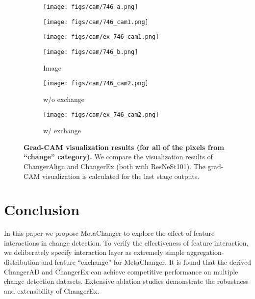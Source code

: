 \documentclass[10pt,twocolumn,letterpaper]{article}
\begin{document}
\begin{figure}
  \centering
  \begin{subfigure}{0.322\linewidth}
    \texttt{[image: figs/cam/746\_a.png]}
\label{fig:cam-a1}
  \end{subfigure}
  \hfill
  \begin{subfigure}{0.322\linewidth}
    \texttt{[image: figs/cam/746\_cam1.png]}
\label{fig:cam-a2}
  \end{subfigure}
  \hfill
  \begin{subfigure}{0.322\linewidth}
    \texttt{[image: figs/cam/ex\_746\_cam1.png]}
\label{fig:cam-a3}
  \end{subfigure}
  \hfill
  \begin{subfigure}{0.322\linewidth}
    \texttt{[image: figs/cam/746\_b.png]}
    \caption{ Image}
    \label{fig:cam-a4}
  \end{subfigure}
  \hfill
  \begin{subfigure}{0.322\linewidth}
    \texttt{[image: figs/cam/746\_cam2.png]}
    \caption{w/o exchange}
    \label{fig:cam-a5}
  \end{subfigure}
  \hfill
  \begin{subfigure}{0.322\linewidth}
    \texttt{[image: figs/cam/ex\_746\_cam2.png]}
    \caption{w/ exchange}
    \label{fig:cam-a6}
  \end{subfigure}
  
  \caption{\textbf{Grad-CAM visualization results (for all of the pixels from ``change'' category).} We compare the visualization results of ChangerAlign and ChangerEx (both with ResNeSt101). The grad-CAM visualization is calculated for the last stage outputs.}
  \label{fig:cam}
\end{figure}



\section{Conclusion}
In this paper we propose MetaChanger to explore the effect of feature interactions in change detection. To verify the effectiveness of feature interaction, we deliberately specify interaction layer as extremely simple aggregation-distribution and feature ``exchange'' for MetaChanger.
It is found that the derived ChangerAD and ChangerEx can achieve competitive performance on multiple change detection datasets. Extensive ablation studies demonstrate the robustness and extensibility of ChangerEx. 
\end{document}
